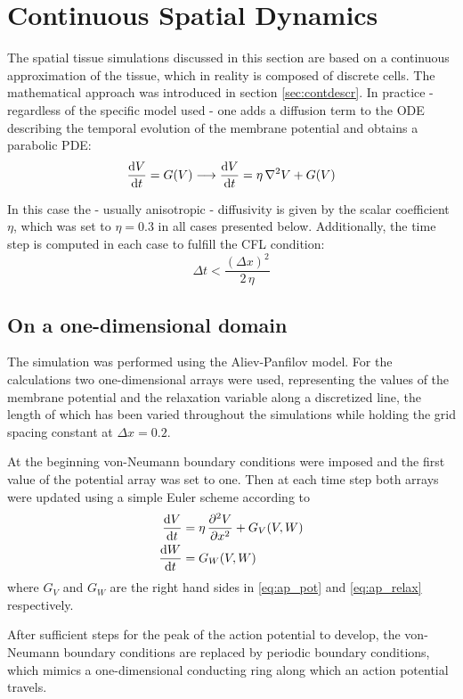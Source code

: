 \section{Continuous Spatial Dynamics}
The spatial tissue simulations discussed in this section are based on a
continuous approximation of the tissue, which in reality is composed of
discrete cells. The mathematical approach was introduced in section
\ref{sec:contdescr}. In practice - regardless of the specific model used - one
adds a diffusion term to the ODE describing the temporal evolution of the
membrane potential and obtains a parabolic PDE:
\begin{equation}
    \dv{V}{t}=G(V)\longrightarrow\dv{V}{t}=\eta\,\nabla^2{V}+G(V)
\end{equation}

In this case the - usually anisotropic - diffusivity is given by the scalar
coefficient $\eta$, which was set to $\eta=0.3$ in all cases presented below.
Additionally, the time step is computed in each case to fulfill the CFL
condition:
\begin{equation*}
    \Delta{t}<\frac{(\Delta{x})^2}{2\,\eta}
\end{equation*}


\subsection{On a one-dimensional domain}
\label{sec:1d}
The simulation was performed using the Aliev-Panfilov model. For the
calculations two one-dimensional arrays were used, representing the values of the membrane
potential and the relaxation variable along a discretized line, the length of
which has been varied throughout the simulations while holding the grid
spacing constant at $\Delta{x}=0.2$.

At the beginning von-Neumann boundary conditions were imposed and the first
value of the potential array was set to one. Then at each time step both arrays
were updated using a simple Euler scheme according to
\begin{align*}
    \dv{V}{t}&=\eta\,\pdv[2]{V}{x}+G_{V}(V, W) \\
    \dv{W}{t}&=G_{W}(V, W)
\end{align*}
where $G_V$ and $G_W$ are the right hand sides in \eqref{eq:ap_pot} and
\eqref{eq:ap_relax} respectively.

After sufficient steps for the peak of the action potential to develop, the
von-Neumann boundary conditions are replaced by periodic boundary
conditions, which mimics a one-dimensional conducting ring along which an
action potential travels.

